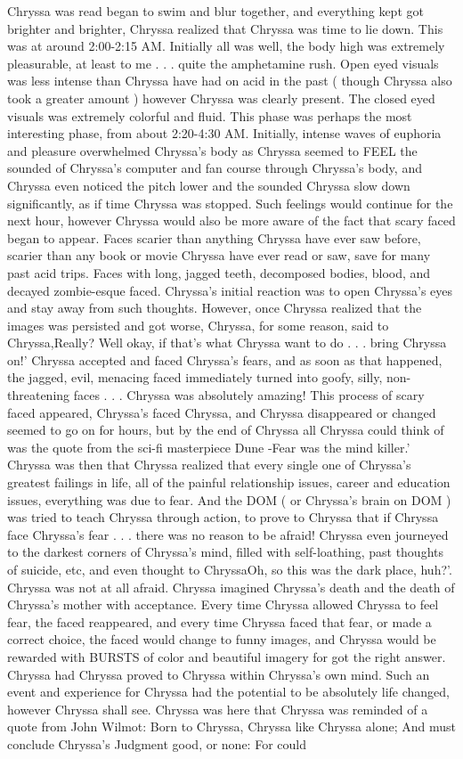\documentclass[12pt]{book}
\begin{document}
Chryssa was read began to swim and blur together, and everything kept got brighter and brighter, Chryssa realized that Chryssa was time to lie down. This was at around 2:00-2:15 AM. Initially all was well, the body high was extremely pleasurable, at least to me . . .  quite the amphetamine rush. Open eyed visuals was less intense than Chryssa have had on acid in the past ( though Chryssa also took a greater amount ) however Chryssa was clearly present. The closed eyed visuals was extremely colorful and fluid. This phase was perhaps the most interesting phase, from about 2:20-4:30 AM. Initially, intense waves of euphoria and pleasure overwhelmed Chryssa's body as Chryssa seemed to FEEL the sounded of Chryssa's computer and fan course through Chryssa's body, and Chryssa even noticed the pitch lower and the sounded Chryssa slow down significantly, as if time Chryssa was stopped. Such feelings would continue for the next hour, however Chryssa would also be more aware of the fact that scary faced began to appear. Faces scarier than anything Chryssa have ever saw before, scarier than any book or movie Chryssa have ever read or saw, save for many past acid trips. Faces with long, jagged teeth, decomposed bodies, blood, and decayed zombie-esque faced. Chryssa's initial reaction was to open Chryssa's eyes and stay away from such thoughts. However, once Chryssa realized that the images was persisted and got worse, Chryssa, for some reason, said to Chryssa,Really? Well okay, if that's what Chryssa want to do . . .  bring Chryssa on!' Chryssa accepted and faced Chryssa's fears, and as soon as that happened, the jagged, evil, menacing faced immediately turned into goofy, silly, non-threatening faces . . .  Chryssa was absolutely amazing! This process of scary faced appeared, Chryssa's faced Chryssa, and Chryssa disappeared or changed seemed to go on for hours, but by the end of Chryssa all Chryssa could think of was the quote from the sci-fi masterpiece Dune -Fear was the mind killer.' Chryssa was then that Chryssa realized that every single one of Chryssa's greatest failings in life, all of the painful relationship issues, career and education issues, everything was due to fear. And the DOM ( or Chryssa's brain on DOM ) was tried to teach Chryssa through action, to prove to Chryssa that if Chryssa face Chryssa's fear . . .  there was no reason to be afraid! Chryssa even journeyed to the darkest corners of Chryssa's mind, filled with self-loathing, past thoughts of suicide, etc, and even thought to ChryssaOh, so this was the dark place, huh?'. Chryssa was not at all afraid. Chryssa imagined Chryssa's death and the death of Chryssa's mother with acceptance. Every time Chryssa allowed Chryssa to feel fear, the faced reappeared, and every time Chryssa faced that fear, or made a correct choice, the faced would change to funny images, and Chryssa would be rewarded with BURSTS of color and beautiful imagery for got the right answer. Chryssa had Chryssa proved to Chryssa within Chryssa's own mind. Such an event and experience for Chryssa had the potential to be absolutely life changed, however Chryssa shall see. Chryssa was here that Chryssa was reminded of a quote from John Wilmot: Born to Chryssa, Chryssa like Chryssa alone; And must conclude Chryssa's Judgment good, or none: For could 
\end{document}
